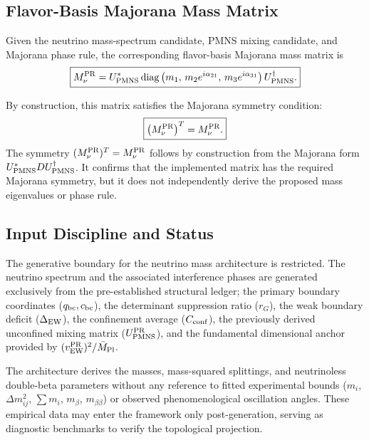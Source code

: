 \documentclass[11pt]{article}
\begin{document}
\subsection{Flavor-Basis Majorana Mass Matrix}
\label{sec:pr2_flavor_basis_majorana_mass_matrix}
Given the neutrino mass-spectrum candidate, PMNS mixing candidate, and Majorana phase rule, the corresponding flavor-basis Majorana mass matrix is
\begin{equation}
\boxed{
M_\nu^{\rm PR}
=
U_{\rm PMNS}^{*}
\,{\rm diag}
\left(
m_1,\,
m_2e^{i\alpha_{21}},\,
m_3e^{i\alpha_{31}}
\right)
U_{\rm PMNS}^{\dagger}.
}
\end{equation}

By construction, this matrix satisfies the Majorana symmetry condition:
\begin{equation}
\boxed{
\left(
M_\nu^{\rm PR}
\right)^T
=
M_\nu^{\rm PR}.
}
\end{equation}
The symmetry $(M_\nu^{\rm PR})^T=M_\nu^{\rm PR}$ 
follows by construction from the Majorana form $U_{\rm PMNS}^{*}DU_{\rm PMNS}^{\dagger}$. It confirms that the implemented matrix has the required Majorana symmetry, but it does not independently derive the proposed mass eigenvalues or phase rule.

\subsection{Input Discipline and Status}
\label{sec:pr2_neutrino_input_discipline_status}

The generative boundary for the neutrino mass architecture is restricted. The neutrino spectrum and the associated interference phases are generated exclusively from the pre-established structural ledger; the primary boundary coordinates ($q_{\rm bc}, c_{\rm bc}$), the determinant suppression ratio ($r_G$), the weak boundary deficit ($\Delta_{\rm EW}$), the confinement average ($C_{\rm conf}$), the previously derived unconfined mixing matrix ($U_{\rm PMNS}^{\rm PR}$), and the fundamental dimensional anchor provided by $(v_{\rm EW}^{\rm PR})^2 / \bar M_{\rm Pl}$.

 The architecture derives the masses, mass-squared splittings, and neutrinoless double-beta parameters without any reference to fitted experimental bounds ($m_i$, $\Delta m_{ij}^2$, $\sum m_i$, $m_\beta$, $m_{\beta\beta}$) or observed phenomenological oscillation angles. These empirical data may enter the framework only post-generation, serving as diagnostic benchmarks to verify the topological projection.
\end{document}
